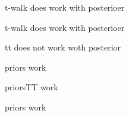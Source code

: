 \begin{figure}[h]
	\centering
	\scalebox{0.66}{}
	\caption[]{t-walk does work with posterioer}
	\label{fig:Results}
\end{figure}
\begin{figure}[h]
	\centering
	\scalebox{0.66}{}
	\caption[]{t-walk does work with posterioer}
	\label{fig:Results}
\end{figure}
\begin{figure}[h]
	\centering
	\scalebox{0.66}{}
	\caption[]{tt does not work woth posterior}
	\label{fig:Results}
\end{figure}



\begin{figure}[h]
	\centering
	\scalebox{1}{}
	\caption[]{priors work}
	\label{fig:Results}
\end{figure}


\begin{figure}[h]
	\centering
	\scalebox{1}{}
	\caption[]{priorsTT work}
	\label{fig:Results}
\end{figure}


\begin{figure}[h]
	\centering
	\scalebox{1}{}
	\caption[]{priors work}
	\label{fig:Results}
\end{figure}


